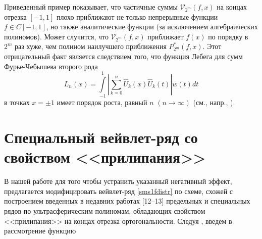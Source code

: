 Приведенный пример показывает, что частичные суммы $\mathcal{V}_{2^m}(f, x)$ на концах отрезка $[-1,1]$ плохо приближают не только непрерывные функции $f \in C[-1,1]$, но также аналитические функции (за исключением алгебраических полиномов).
Может случится, что $\mathcal{V}_{2^m}(f, x)$ приближает $f(x)$ по порядку в $2^m$ раз хуже, чем полином наилучшего приближения $P^{*}_{2^m}(f,x)$.
Этот отрицательный факт является следствием того, что функция Лебега для сумм Фурье-Чебышева второго рода
\begin{equation*}
L_{n}(x) = \int\limits_{-1}^{1}  \left|\sum\limits_{k=0}^{n}\hat U_{k}(x)\hat U_{k}(t)\right| w(t)dt
\end{equation*}
в точках $x = \pm1$ имеет порядок роста, равный $n$ $(n\to\infty)$ (см., напр., \cite{sms14}).

\section{Специальный вейвлет-ряд со свойством <<прилипания>>}

В нашей работе \cite{sms112} для того чтобы устранить указанный негативный эффект, предлагается модифицировать вейвлет-ряд \eqref{sms1fdistr} по схеме, схожей с построением введенных в недавних работах [12--13]
предельных и специальных рядов по ультрасферическим полиномам, обладающих свойством <<прилипания>> на концах отрезка ортогональности. Следуя \cite{sms13},
введем в рассмотрение функцию

